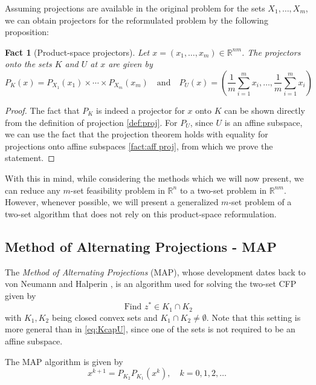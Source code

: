\documentclass[smallextended,numbook,nospthms]{svjour3}
\theoremstyle{plain}
\newtheorem{fact}[theorem]{Fact}
\theoremstyle{definition}
\def\RR{\mathds R}
\begin{document}
Assuming projections are available in the original problem for the sets $X_{1}, \ldots, X_{m}$, we can obtain projectors for the reformulated problem by the following proposition:
\begin{fact}[Product-space projectors]\label{fact:Pierra proj}
Let $x=\left(x_{1}, \ldots, x_{m}\right) \in \RR^{nm}$. The projectors onto the sets $K$ and $U$ at $x$ are given by
\[
P_{K}(x)=P_{X_{1}}\left(x_{1}\right) \times \cdots \times P_{X_{m}}\left(x_{m}\right) \quad \text {and} \quad P_{U}(x)=\left(\frac{1}{m} \sum_{i=1}^{m} x_{i}, \ldots, \frac{1}{m} \sum_{i=1}^{m} x_{i}\right)
\]
\end{fact}
\begin{proof}
	The fact that $P_{K}$ is indeed a projector for $x$ onto $K$ can be shown directly from the definition of projection \cref{def:proj}. For $P_{U}$, since $U$ is an affine subspace, we can use the fact that the projection theorem holds with equality for projections onto affine subspaces \cref{fact:aff proj}, from which we prove the statement.
\end{proof}
With this in mind, while considering the methods which we will now present, we can reduce any $m$-set feasibility problem in $\RR^{n}$ to a two-set problem in $\RR^{nm}$. However, whenever possible, we will present a generalized $m$-set problem of a two-set algorithm that does not rely on this product-space reformulation.

\subsection{Method of Alternating Projections - MAP}\label{subsec:MAP}

The \emph{Method of Alternating Projections} (MAP), whose development dates back to von Neumann \cite{Neumann:1950} and Halperin \cite{Halperin:1962ut}, is an algorithm used for solving the two-set CFP given by
$$
\text { Find } z^{*} \in K_1 \cap K_2
$$
with $K_1, K_2$ being closed convex sets and $K_1 \cap K_2 \not = \emptyset$.
Note that this setting is more general than in \cref{eq:KcapU}, since one of the sets is not required to be an affine subspace.

The MAP algorithm is given by
\begin{equation}
	x^{k+1}=P_{K_{2}}P_{K_{1}}\left(x^{k}\right), \quad k=0,1,2, \ldots \label{eq:MAP}
\end{equation}
\end{document}
